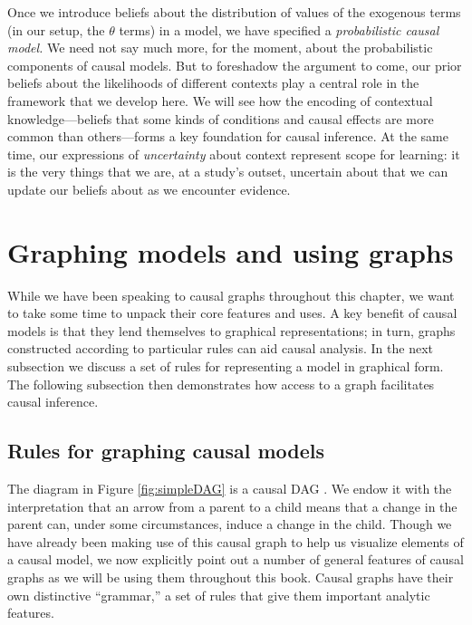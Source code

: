 \documentclass[
  12pt,
]{book}
\begin{document}
Once we introduce beliefs about the distribution of values of the exogenous terms (in our setup, the \(\theta\) terms) in a model, we have specified a \emph{probabilistic causal model.} We need not say much more, for the moment, about the probabilistic components of causal models. But to foreshadow the argument to come, our prior beliefs about the likelihoods of different contexts play a central role in the framework that we develop here. We will see how the encoding of contextual knowledge---beliefs that some kinds of conditions and causal effects are more common than others---forms a key foundation for causal inference. At the same time, our expressions of \emph{uncertainty} about context represent scope for learning: it is the very things that we are, at a study's outset, uncertain about that we can update our beliefs about as we encounter evidence.

\hypertarget{graphing-models-and-using-graphs}{%
\section{Graphing models and using graphs}\label{graphing-models-and-using-graphs}}

While we have been speaking to causal graphs throughout this chapter, we want to take some time to unpack their core features and uses. A key benefit of causal models is that they lend themselves to graphical representations; in turn, graphs constructed according to particular rules can aid causal analysis. In the next subsection we discuss a set of rules for representing a model in graphical form. The following subsection then demonstrates how access to a graph facilitates causal inference.

\hypertarget{graphing}{%
\subsection{Rules for graphing causal models}\label{graphing}}

The diagram in Figure \ref{fig:simpleDAG} is a causal DAG \citep{hernan2006instruments}. We endow it with the interpretation that an arrow from a parent to a child means that a change in the parent can, under some circumstances, induce a change in the child. Though we have already been making use of this causal graph to help us visualize elements of a causal model, we now explicitly point out a number of general features of causal graphs as we will be using them throughout this book. Causal graphs have their own distinctive ``grammar,'' a set of rules that give them important analytic features.
\end{document}
